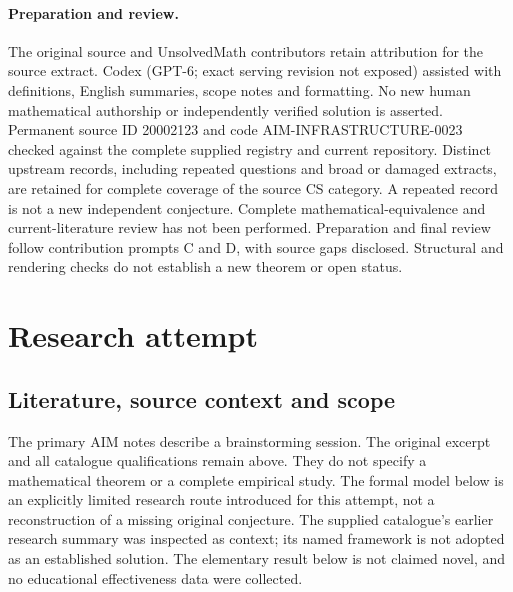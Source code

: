 \documentclass[11pt]{article}
\begin{document}
\paragraph{Preparation and review.}
The original source and UnsolvedMath contributors retain attribution for the source extract. Codex (GPT-6; exact serving revision not exposed) assisted with definitions, English summaries, scope notes and formatting. No new human mathematical authorship or independently verified solution is asserted. Permanent source ID 20002123 and code AIM-INFRASTRUCTURE-0023 checked against the complete supplied registry and current repository. Distinct upstream records, including repeated questions and broad or damaged extracts, are retained for complete coverage of the source CS category. A repeated record is not a new independent conjecture. Complete mathematical-equivalence and current-literature review has not been performed. Preparation and final review follow contribution prompts C and D, with source gaps disclosed. Structural and rendering checks do not establish a new theorem or open status.
\label{end:20002123}

\section{Research attempt}
\subsection{Literature, source context and scope}
The primary AIM notes describe a brainstorming session. The original excerpt and all catalogue qualifications remain above. They do not specify a mathematical theorem or a complete empirical study. The formal model below is an explicitly limited research route introduced for this attempt, not a reconstruction of a missing original conjecture. The supplied catalogue's earlier research summary was inspected as context; its named framework is not adopted as an established solution. The elementary result below is not claimed novel, and no educational effectiveness data were collected.
\end{document}
